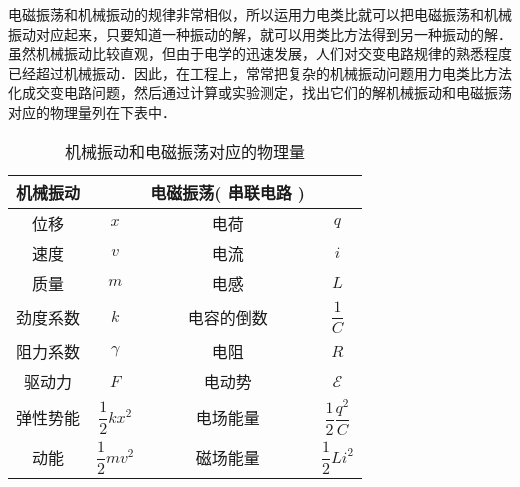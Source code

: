 
电磁振荡和机械振动的规律非常相似，所以运用力电类比就可以把电磁振荡和机械振动对应起来，只要知道一种振动的解，就可以用类比方法得到另一种振动的解．虽然机械振动比较直观，但由于电学的迅速发展，人们对交变电路规律的熟悉程度已经超过机械振动．因此，在工程上，常常把复杂的机械振动问题用力电类比方法化成交变电路问题，然后通过计算或实验测定，找出它们的解机械振动和电磁振荡对应的物理量列在下表中．

\begin{table}[ht]
\centering
\caption{机械振动和电磁振荡对应的物理量}\label{MeElec_tab1}
\begin{tabular}{cccc}
\hline  机械振动  & &  电磁振荡(  串联电路 ) &\\ \hline  位移  & $x$ &  电荷  & $q$ \\ \hline  速度  & $v $&  电流  & $i$ \\ \hline  质量  & $m$ &  电感  & $L$ \\ \hline  劲度系数  & $k$ &  电容的倒数  & $\dfrac1C$ \\ \hline  阻力系数  & $\gamma$ &  电阻  & $R$  \\ \hline  驱动力  &$F$ &  电动势  & $\mathscr E$  \\ \hline  弹性势能  &  $\dfrac12 k x^2$ &  电场能量  & $\dfrac12 \dfrac{q^2}C$ \\ \hline  动能  & $\dfrac12 m v^2$ &  磁场能量  &  $\dfrac12 L i^2$ \\ \hline
\end{tabular}
\end{table}
